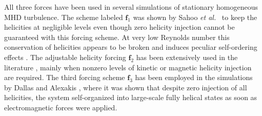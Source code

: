 \documentclass[aps,pre,onecolumn,superscriptaddress,notitlepage]{revtex4-1}
\newcommand{\etal}{\textit{et al.}}
\renewcommand{\vec}[1]{\bm{#1}}
\begin{document}
All three forces have been used in several simulations of stationary homogeneous MHD turbulence. 
The scheme labeled $\vec{f}_1$ was shown by Sahoo \etal~\cite{Sahoo11} to keep the helicities at negligible levels
even though zero helicity injection cannot be guaranteed with this forcing scheme. 
At very low Reynolds number this conservation of helicities appears to be broken and 
induces peculiar self-ordering effects \cite{McComb15b,Linkmann15b}. 
The adjustable helicity forcing 
$\vec{f}_2$ has been extensively used in the literature \cite{Brandenburg01,Mueller12,Malapaka13,Linkmann16b}, mainly when nonzero 
levels of kinetic \cite{Brandenburg01} or magnetic \cite{Mueller12,Malapaka13,Linkmann16b} helicity injection are required. The 
third forcing scheme $\vec{f}_3$ has been employed in the simulations by Dallas and Alexakis \cite{Dallas14a}, where 
it was shown that despite zero injection of all helicities, the system self-organized into large-scale fully helical 
states as soon as electromagnetic forces were applied. 
\end{document}
